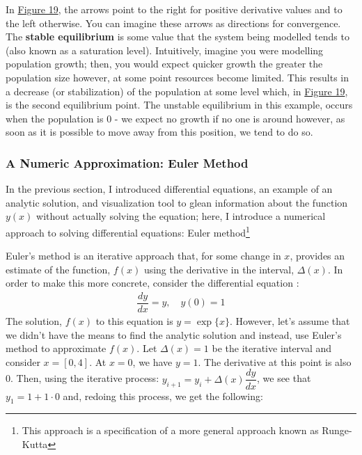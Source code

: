 \documentclass{article}
\begin{document}
\noindent In \hyperref[fig:phasePortrait]{Figure 19}, the arrows point to the right for positive derivative values and to the left otherwise. You can imagine these arrows as directions for convergence. The \textbf{stable equilibrium} is some value that the system being modelled tends to (also known as a saturation level). Intuitively, imagine you were modelling population growth; then, you would expect quicker growth the greater the population size however, at some point resources become limited. This results in a decrease (or stabilization) of the population at some level which, in \hyperref[fig:phasePortrait]{Figure 19}, is the second equilibrium point. The unstable equilibrium in this example, occurs when the population is 0 - we expect no growth if no one is around however, as soon as it is possible to move away from this position, we tend to do so.

\subsubsection{A Numeric Approximation: Euler Method}

\noindent In the previous section, I introduced differential equations, an example of an analytic solution, and visualization tool to glean information about the function $y(x)$ without actually solving the equation; here, I introduce a numerical approach to solving differential equations: Euler method\footnote{This approach is a specification of a more general approach known as Runge-Kutta} 

\noindent Euler's method is an iterative approach that, for some change in $x$, provides an estimate of the function, $f(x)$ using the derivative in the interval, $\Delta (x)$. In order to make this more concrete, consider the differential equation \cite{euler}:
\begin{align}
    \dfrac{dy}{dx} = y, \hspace{1em} y(0) = 1
\end{align}
\noindent The solution, $f(x)$ to this equation is $y = \exp\{x\}$. However, let's assume that we didn't have the means to find the analytic solution and instead, use Euler's method to approximate $f(x)$. Let $\Delta (x) = 1$ be the iterative interval and consider $x = [0, 4]$. At $x = 0$, we have $y = 1$. The derivative at this point is also 0. Then, using the iterative process: $y_{i + 1} = y_{i} + \Delta(x)\dfrac{dy}{dx}$, we see that $y_{1} = 1 + 1\cdot0$ and, redoing this process, we get the following:
\end{document}
